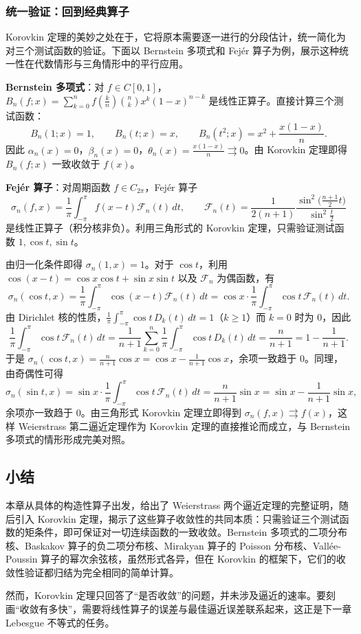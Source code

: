 \subsubsection{统一验证：回到经典算子}

Korovkin 定理的美妙之处在于，它将原本需要逐一进行的分段估计，统一简化为对三个测试函数的验证。下面以 Bernstein 多项式和 Fejér 算子为例，展示这种统一性在代数情形与三角情形中的平行应用。

\textbf{Bernstein 多项式}：对 $f\in C[0,1]$，$B_n(f;x)=\sum_{k=0}^{n} f(\frac{k}{n})\binom{n}{k}x^{k}(1-x)^{n-k}$ 是线性正算子。直接计算三个测试函数：
\[
B_n(1;x)=1,\qquad B_n(t;x)=x,\qquad B_n(t^{2};x)=x^{2}+\frac{x(1-x)}{n}.
\]
因此 $\alpha_n(x)=0$，$\beta_n(x)=0$，$\theta_n(x)=\frac{x(1-x)}{n}\rightrightarrows 0$。由 Korovkin 定理即得 $B_n(f;x)$ 一致收敛于 $f(x)$。

\textbf{Fejér 算子}：对周期函数 $f\in C_{2\pi}$，Fejér 算子
\[
\sigma_n(f,x)=\frac{1}{\pi}\int_{-\pi}^{\pi}f(x-t)\mathcal{F}_n(t)\,dt,\qquad
\mathcal{F}_n(t)=\frac{1}{2(n+1)}\frac{\sin^{2}\bigl(\frac{n+1}{2}t\bigr)}{\sin^{2}\frac{t}{2}}
\]
是线性正算子（积分核非负）。利用三角形式的 Korovkin 定理，只需验证测试函数 $1,\cos t,\sin t$。

由归一化条件即得 $\sigma_n(1,x)=1$。对于 $\cos t$，利用 $\cos(x-t)=\cos x\cos t+\sin x\sin t$ 以及 $\mathcal{F}_n$ 为偶函数，有
\[
\sigma_n(\cos t,x)=\frac{1}{\pi}\int_{-\pi}^{\pi}\cos(x-t)\mathcal{F}_n(t)\,dt
=\cos x\cdot\frac{1}{\pi}\int_{-\pi}^{\pi}\cos t\,\mathcal{F}_n(t)\,dt.
\]
由 Dirichlet 核的性质，$\frac{1}{\pi}\int_{-\pi}^{\pi}\cos t\,D_k(t)\,dt=1$（$k\ge 1$）而 $k=0$ 时为 $0$，因此
\[
\frac{1}{\pi}\int_{-\pi}^{\pi}\cos t\,\mathcal{F}_n(t)\,dt
=\frac{1}{n+1}\sum_{k=0}^{n}\frac{1}{\pi}\int_{-\pi}^{\pi}\cos t\,D_k(t)\,dt
=\frac{n}{n+1}=1-\frac{1}{n+1}.
\]
于是 $\sigma_n(\cos t,x)=\frac{n}{n+1}\cos x=\cos x-\frac{1}{n+1}\cos x$，余项一致趋于 $0$。同理，由奇偶性可得
\[
\sigma_n(\sin t,x)=\sin x\cdot\frac{1}{\pi}\int_{-\pi}^{\pi}\cos t\,\mathcal{F}_n(t)\,dt
=\frac{n}{n+1}\sin x=\sin x-\frac{1}{n+1}\sin x,
\]
余项亦一致趋于 $0$。由三角形式 Korovkin 定理立即得到 $\sigma_n(f,x)\rightrightarrows f(x)$，这样 Weierstrass 第二逼近定理作为 Korovkin 定理的直接推论而成立，与 Bernstein 多项式的情形形成完美对照。

\subsection{小结}

本章从具体的构造性算子出发，给出了 Weierstrass 两个逼近定理的完整证明，随后引入 Korovkin 定理，揭示了这些算子收敛性的共同本质：只需验证三个测试函数的矩条件，即可保证对一切连续函数的一致收敛。Bernstein 多项式的二项分布核、Baskakov 算子的负二项分布核、Mirakyan 算子的 Poisson 分布核、Vallée-Poussin 算子的幂次余弦核，虽然形式各异，但在 Korovkin 的框架下，它们的收敛性验证都归结为完全相同的简单计算。

然而，Korovkin 定理只回答了“是否收敛”的问题，并未涉及逼近的速率。要刻画“收敛有多快”，需要将线性算子的误差与最佳逼近误差联系起来，这正是下一章 Lebesgue 不等式的任务。